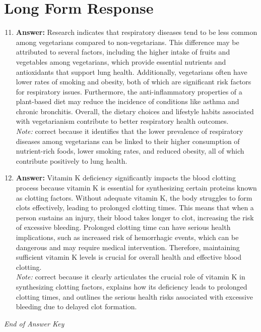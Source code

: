 \documentclass[12pt]{article}
\begin{document}
\section*{Long Form Response}
\begin{enumerate}[label=\arabic*.]
\setcounter{enumi}{10}
\item \textbf{Answer:} Research indicates that respiratory diseases tend to be less common among vegetarians compared to non-vegetarians. This difference may be attributed to several factors, including the higher intake of fruits and vegetables among vegetarians, which provide essential nutrients and antioxidants that support lung health. Additionally, vegetarians often have lower rates of smoking and obesity, both of which are significant risk factors for respiratory issues. Furthermore, the anti-inflammatory properties of a plant-based diet may reduce the incidence of conditions like asthma and chronic bronchitis. Overall, the dietary choices and lifestyle habits associated with vegetarianism contribute to better respiratory health outcomes.
\\ \textit{Note:} correct because it identifies that the lower prevalence of respiratory diseases among vegetarians can be linked to their higher consumption of nutrient-rich foods, lower smoking rates, and reduced obesity, all of which contribute positively to lung health.
\item \textbf{Answer:} Vitamin K deficiency significantly impacts the blood clotting process because vitamin K is essential for synthesizing certain proteins known as clotting factors. Without adequate vitamin K, the body struggles to form clots effectively, leading to prolonged clotting times. This means that when a person sustains an injury, their blood takes longer to clot, increasing the risk of excessive bleeding. Prolonged clotting time can have serious health implications, such as increased risk of hemorrhagic events, which can be dangerous and may require medical intervention. Therefore, maintaining sufficient vitamin K levels is crucial for overall health and effective blood clotting.
\\ \textit{Note:} correct because it clearly articulates the crucial role of vitamin K in synthesizing clotting factors, explains how its deficiency leads to prolonged clotting times, and outlines the serious health risks associated with excessive bleeding due to delayed clot formation.
\end{enumerate}

\vfill
\noindent\textit{End of Answer Key}
\end{document}
